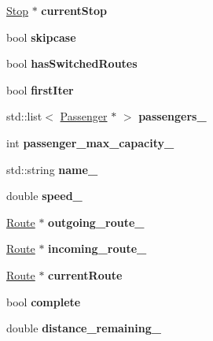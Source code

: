 \begin{DoxyCompactItemize}
\item 
\mbox{\label{classBus_a71d4efb1f0e2810c712d2b04eaa9f909}} 
\hyperlink{classStop}{Stop} $\ast$ {\bfseries current\+Stop}
\item 
\mbox{\label{classBus_aca3e8ae5c42858f0f9e59c53270ee04e}} 
bool {\bfseries skipcase}
\item 
\mbox{\label{classBus_a1e9e0ddf70d42b3320669f275a586587}} 
bool {\bfseries has\+Switched\+Routes}
\item 
\mbox{\label{classBus_a009d8dacb64ef5dc6fa9a8f3511face9}} 
bool {\bfseries first\+Iter}
\item 
\mbox{\label{classBus_a4a6e51d12fa70cbf9e973e82090773f3}} 
std\+::list$<$ \hyperlink{classPassenger}{Passenger} $\ast$ $>$ {\bfseries passengers\+\_\+}
\item 
\mbox{\label{classBus_a0f8a0586923d96c085a6d33b74150962}} 
int {\bfseries passenger\+\_\+max\+\_\+capacity\+\_\+}
\item 
\mbox{\label{classBus_a414fa2321dd325141c60741eb838972d}} 
std\+::string {\bfseries name\+\_\+}
\item 
\mbox{\label{classBus_acae5a7639b0c5b3c4a1d1f888ac18ce1}} 
double {\bfseries speed\+\_\+}
\item 
\mbox{\label{classBus_a625684b3e464f90f822f6303d6113b49}} 
\hyperlink{classRoute}{Route} $\ast$ {\bfseries outgoing\+\_\+route\+\_\+}
\item 
\mbox{\label{classBus_a393eb8015c87cc306a4ce18bf3f19956}} 
\hyperlink{classRoute}{Route} $\ast$ {\bfseries incoming\+\_\+route\+\_\+}
\item 
\mbox{\label{classBus_a0a220de5b56257d6835ae58a95f2c352}} 
\hyperlink{classRoute}{Route} $\ast$ {\bfseries current\+Route}
\item 
\mbox{\label{classBus_ae8b6cf1028a4f5dffd82c1423f17e58e}} 
bool {\bfseries complete}
\item 
\mbox{\label{classBus_ae0e153e41426834bb6c15ffa90bca417}} 
double {\bfseries distance\+\_\+remaining\+\_\+}
\end{DoxyCompactItemize}


